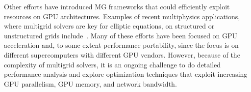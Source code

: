 \documentclass[sigconf]{acmart}
\begin{document}
Other efforts have introduced MG frameworks that could
efficiently exploit resources on GPU architectures. Examples
of recent multiphysics applications, where multigrid solvers
are key for elliptic equations, on structured or unstructured
grids include~\cite{Amrex,Anderson,Grete,mali}. Many of these efforts have been
focused on GPU acceleration and, to some extent performance
portability, since the focus is on different supercomputers with
different GPU vendors. However, because of the complexity
of multigrid solvers, it is an ongoing challenge to do detailed
performance analysis and explore optimization techniques
that exploit increasing GPU parallelism, GPU memory, and
network bandwidth.



\end{document}
